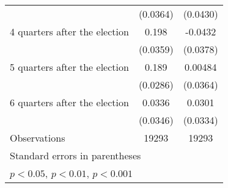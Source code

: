 \begin{table}[htbp]
\begin{tabular}{l*{2}{c}}
                    &    (0.0364)         &    (0.0430)         \\
[1em]
 4 quarters after the election&       0.198\sym{***}&     -0.0432         \\
                    &    (0.0359)         &    (0.0378)         \\
[1em]
 5 quarters after the election&       0.189\sym{***}&     0.00484         \\
                    &    (0.0286)         &    (0.0364)         \\
[1em]
 6 quarters after the election&      0.0336         &      0.0301         \\
                    &    (0.0346)         &    (0.0334)         \\
\hline
Observations        &       19293         &       19293         \\
\hline\hline
\multicolumn{3}{l}{\footnotesize Standard errors in parentheses}\\
\multicolumn{3}{l}{\footnotesize \sym{*} \(p<0.05\), \sym{**} \(p<0.01\), \sym{***} \(p<0.001\)}\\
\end{tabular}
\end{table}
